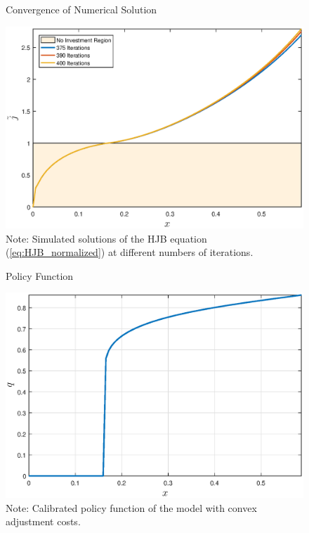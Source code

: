 \documentclass[12pt, a4paper]{article}
\begin{document}
\begin{figure}[]
\caption{Convergence of Numerical Solution}
\label{fig:Iteration_HJB}\centering
\includegraphics[scale=.6]{images/Iteration_HJB.eps}
\caption*{Note: Simulated solutions of the HJB equation (\ref{eq:HJB_normalized})
at different numbers of iterations.}
\end{figure}



\begin{figure}[]
\caption{Policy Function}
\label{fig:Policy}\centering
\includegraphics[scale=.6]{images/Policy.eps}
\caption*{Note: Calibrated policy function of the model with convex adjustment costs.}
\end{figure}
\end{document}
